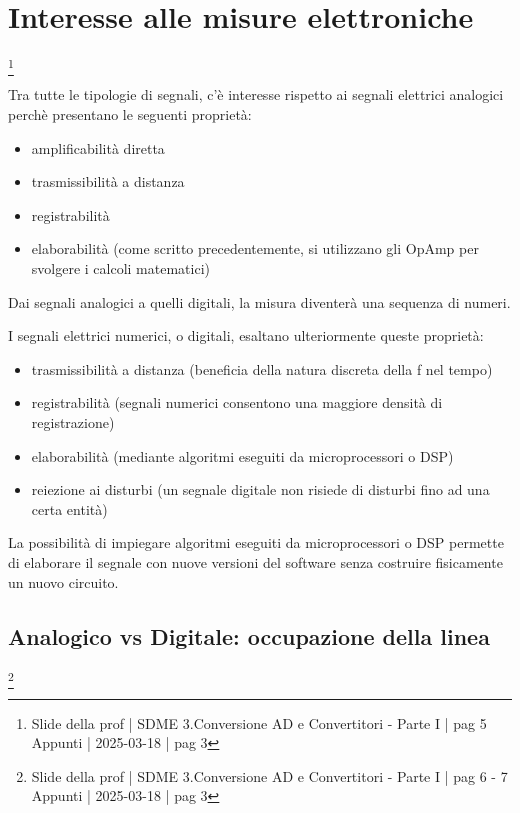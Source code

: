 \newpage 

\section{Interesse alle misure elettroniche}
\footnote{Slide della prof | SDME 3.Conversione AD e Convertitori - Parte I | pag 5 \\  
Appunti | 2025-03-18 | pag 3}

Tra tutte le tipologie di segnali, c'è interesse rispetto ai segnali elettrici analogici perchè presentano le seguenti proprietà: 

\begin{itemize}
    \item amplificabilità diretta 
    \item trasmissibilità a distanza 
    \item registrabilità 
    \item elaborabilità (come scritto precedentemente, si utilizzano gli OpAmp per svolgere i calcoli matematici)
\end{itemize}

Dai segnali analogici a quelli digitali, la misura diventerà una sequenza di numeri. \newline 

I segnali elettrici numerici, o digitali, esaltano ulteriormente queste proprietà: 

\begin{itemize}
    \item trasmissibilità a distanza (beneficia della natura discreta della f nel tempo) 
    \item registrabilità (segnali numerici consentono una maggiore densità di registrazione)
    \item elaborabilità (mediante algoritmi eseguiti da microprocessori o DSP)
    \item reiezione ai disturbi (un segnale digitale non risiede di disturbi fino ad una certa entità)
\end{itemize}

La possibilità di impiegare algoritmi eseguiti da microprocessori o DSP permette di elaborare il segnale con nuove versioni del 
software senza costruire fisicamente un nuovo circuito. \newline 

\newpage 

\subsection{Analogico vs Digitale: occupazione della linea}
\footnote{Slide della prof | SDME 3.Conversione AD e Convertitori - Parte I | pag 6 - 7 \\  
Appunti | 2025-03-18 | pag 3}


